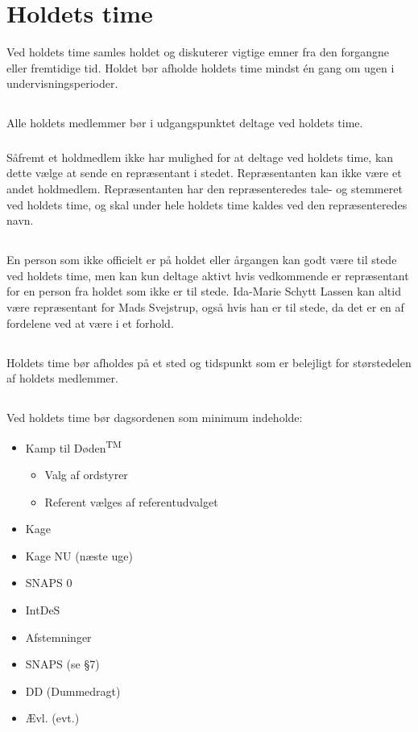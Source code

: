 \documentclass{article}
\let\OldS\S
\renewcommand{\S}{\OldS{}}
\begin{document}
	
	\section{Holdets time}
	Ved holdets time samles holdet og diskuterer vigtige emner fra den forgangne eller 
	fremtidige tid. Holdet bør afholde holdets time mindst én gang om ugen i 
	undervisningsperioder.
	\subsection{}
	Alle holdets medlemmer bør i udgangspunktet deltage ved holdets time.
	\subsubsection{}
	Såfremt et holdmedlem ikke har mulighed for at deltage ved holdets time, kan dette vælge at sende en repræsentant i stedet. Repræsentanten kan ikke være et andet holdmedlem. Repræsentanten har den repræsenteredes tale- og stemmeret ved holdets time, og skal under hele holdets time kaldes ved den repræsenteredes navn.
	\subsection{}
	En person som ikke officielt er på holdet eller årgangen kan godt være til stede ved holdets time, men kan kun deltage aktivt hvis vedkommende er repræsentant for en person fra holdet som ikke er til stede. Ida-Marie Schytt Lassen kan altid være repræsentant for Mads Svejstrup, også hvis han er til stede, da det er en af fordelene ved at være i et forhold.
	\subsection{}
	Holdets time bør afholdes på et sted og tidspunkt som er belejligt for størstedelen af holdets medlemmer.
	\subsection{}
	Ved holdets time bør dagsordenen som minimum indeholde:\\
	\begin{itemize}
		\item Kamp til Døden\textsuperscript{TM}
		\begin{itemize}
			\item Valg af ordstyrer
			\item Referent vælges af referentudvalget
		\end{itemize}
		\item Kage
		\item Kage NU (næste uge)
		\item SNAPS 0
		\item IntDeS
		\item Afstemninger
		\item SNAPS (se \S{7})
		\item DD (Dummedragt)
		\item Ævl. (evt.)
	\end{itemize}
\end{document}
